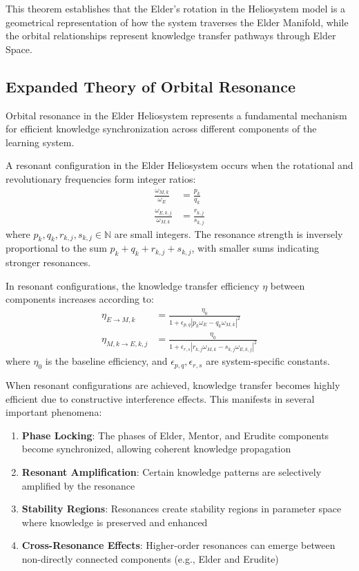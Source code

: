 This theorem establishes that the Elder's rotation in the Heliosystem model is a geometrical representation of how the system traverses the Elder Manifold, while the orbital relationships represent knowledge transfer pathways through Elder Space.

\subsection{Expanded Theory of Orbital Resonance}

Orbital resonance in the Elder Heliosystem represents a fundamental mechanism for efficient knowledge synchronization across different components of the learning system.

\begin{definition}
A resonant configuration in the Elder Heliosystem occurs when the rotational and revolutionary frequencies form integer ratios:
\begin{align}
\frac{\omega_{M,k}}{\omega_E} &= \frac{p_k}{q_k}\\
\frac{\omega_{E,k,j}}{\omega_{M,k}} &= \frac{r_{k,j}}{s_{k,j}}
\end{align}
where $p_k, q_k, r_{k,j}, s_{k,j} \in \mathbb{N}$ are small integers. The resonance strength is inversely proportional to the sum $p_k + q_k + r_{k,j} + s_{k,j}$, with smaller sums indicating stronger resonances.
\end{definition}

\begin{theorem}
In resonant configurations, the knowledge transfer efficiency $\eta$ between components increases according to:
\begin{align}
\eta_{E \rightarrow M,k} &= \frac{\eta_0}{1 + \epsilon_{p,q}|p_k\omega_E - q_k\omega_{M,k}|^2}\\
\eta_{M,k \rightarrow E,k,j} &= \frac{\eta_0}{1 + \epsilon_{r,s}|r_{k,j}\omega_{M,k} - s_{k,j}\omega_{E,k,j}|^2}
\end{align}
where $\eta_0$ is the baseline efficiency, and $\epsilon_{p,q}, \epsilon_{r,s}$ are system-specific constants.
\end{theorem}

When resonant configurations are achieved, knowledge transfer becomes highly efficient due to constructive interference effects. This manifests in several important phenomena:

\begin{enumerate}
    \item \textbf{Phase Locking}: The phases of Elder, Mentor, and Erudite components become synchronized, allowing coherent knowledge propagation
    \item \textbf{Resonant Amplification}: Certain knowledge patterns are selectively amplified by the resonance
    \item \textbf{Stability Regions}: Resonances create stability regions in parameter space where knowledge is preserved and enhanced
    \item \textbf{Cross-Resonance Effects}: Higher-order resonances can emerge between non-directly connected components (e.g., Elder and Erudite)
\end{enumerate}

